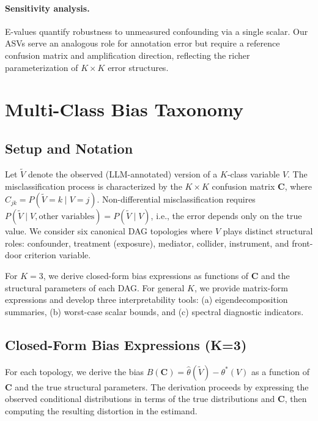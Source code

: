 \documentclass[11pt]{article}
\newcommand{\bC}{\mathbf{C}}
\begin{document}
\paragraph{Sensitivity analysis.}
E-values \citep{vanderweele2017} quantify robustness to unmeasured confounding via a single scalar.
Our ASVs serve an analogous role for annotation error but require a reference confusion matrix and amplification direction, reflecting the richer parameterization of $K\!\times\!K$ error structures.


\section{Multi-Class Bias Taxonomy}
\label{sec:taxonomy}

\subsection{Setup and Notation}

Let $\tilde{V}$ denote the observed (LLM-annotated) version of a $K$-class variable $V$.
The misclassification process is characterized by the $K\!\times\!K$ confusion matrix $\bC$, where $C_{jk} = P(\tilde{V}=k \mid V=j)$.
Non-differential misclassification requires $P(\tilde{V} \mid V, \text{other variables}) = P(\tilde{V} \mid V)$, i.e., the error depends only on the true value.
We consider six canonical DAG topologies where $V$ plays distinct structural roles: confounder, treatment (exposure), mediator, collider, instrument, and front-door criterion variable.

For $K\!=\!3$, we derive closed-form bias expressions as functions of $\bC$ and the structural parameters of each DAG.
For general $K$, we provide matrix-form expressions and develop three interpretability tools: (a) eigendecomposition summaries, (b) worst-case scalar bounds, and (c) spectral diagnostic indicators.

\subsection{Closed-Form Bias Expressions (K=3)}
\label{sec:kthree}

For each topology, we derive the bias $B(\bC) = \hat{\theta}(\tilde{V}) - \theta^*(V)$ as a function of $\bC$ and the true structural parameters.
The derivation proceeds by expressing the observed conditional distributions in terms of the true distributions and $\bC$, then computing the resulting distortion in the estimand.
\end{document}
